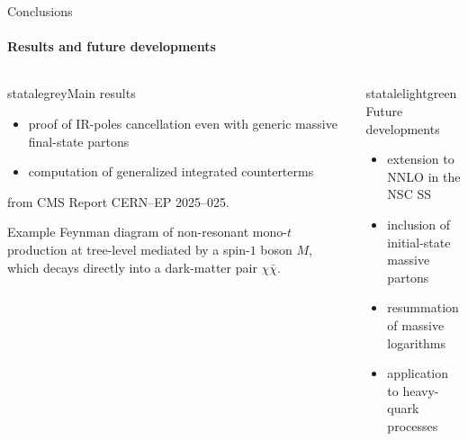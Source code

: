 \begin{frame}{Conclusions}
  \framesubtitle{Results and future developments}

  \begin{columns}

    \begin{column}{0.5 \textwidth}

      \begin{colorblock}[black]{statalegrey}{Main results}
        \begin{itemize}
          \justifying
          \item proof of IR-poles cancellation even with generic massive final-state partons
          \item computation of generalized integrated counterterms
        \end{itemize}
      \end{colorblock}

      \vspace{1.5em}

       from CMS Report CERN--EP 2025--025.

      \justifying
      Example Feynman diagram of non-resonant mono-$ t $ production at tree-level mediated by a spin-$ 1 $ boson $ M $, which decays directly into a dark-matter pair $ \chi \bar{\chi} $.

      \vspace{2em}

    \end{column}

    \begin{column}{0.5 \textwidth}

      \begin{colorblock}[black]{statalelightgreen}{Future developments}
        \begin{itemize}
          \justifying
          \item extension to NNLO in the NSC SS
          \item inclusion of initial-state massive partons
          \item resummation of massive logarithms
          \item application to heavy-quark processes
        \end{itemize}
      \end{colorblock}

      \vspace{-0.5em}

      \begin{figure}
\end{figure}
\end{column}
\end{columns}
\end{frame}
